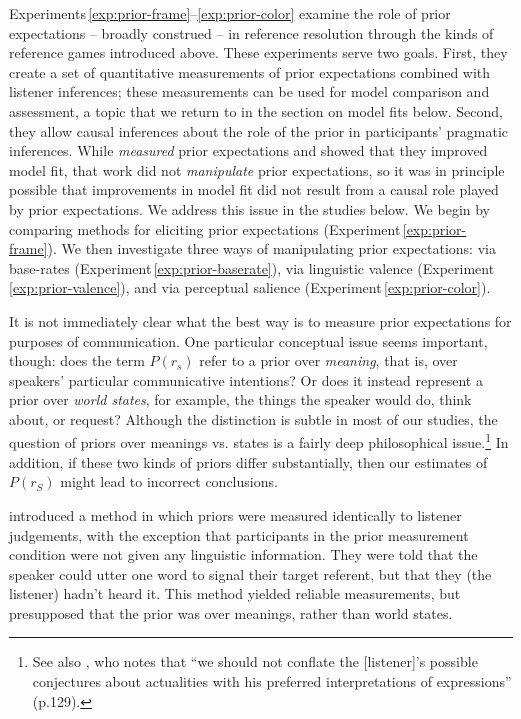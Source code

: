 \documentclass[man,noapacite]{apa2}
\newcounter{Experiment}
\newcommand{\exptref}[1]{Experiment\,\ref{#1}}
\newcommand{\exptrefrange}[2]{Experiments\,\ref{#1}--\ref{#2}}
\begin{document}
\exptrefrange{exp:prior-frame}{exp:prior-color} examine the role of prior expectations -- broadly construed -- in reference resolution through the kinds of reference games introduced above. These experiments serve two goals. First, they create a set of quantitative measurements of prior expectations combined with listener inferences; these measurements can be used for model comparison and assessment, a topic that we return to in the section on model fits below. Second, they allow causal inferences about the role of the prior in participants' pragmatic inferences. While  \emph{measured} prior expectations and showed that they improved model fit, that work did not \emph{manipulate} prior expectations, so it was in principle possible that improvements in model fit did not result from a causal role played by prior expectations. We address this issue in the studies below. We begin by comparing methods for eliciting prior expectations (\exptref{exp:prior-frame}). We then investigate three ways of manipulating prior expectations: via base-rates (\exptref{exp:prior-baserate}), via linguistic valence (\exptref{exp:prior-valence}), and via perceptual salience (\exptref{exp:prior-color}).

It is not immediately clear what the best way is to measure prior expectations for purposes of communication. One particular conceptual issue seems important, though: does the term $P(r_s)$ refer to a prior over \emph{meaning}, that is, over speakers' particular communicative intentions? Or does it instead represent a prior over \emph{world states}, for example, the things the speaker would do, think about, or request? Although the distinction is subtle in most of our studies, the question of priors over meanings vs. states is a fairly deep philosophical issue.\footnote{See also , who notes that ``we should not conflate the [listener]’s possible conjectures about actualities with his preferred interpretations of expressions'' (p.129).}  In addition, if these two kinds of priors differ substantially, then our estimates of $P(r_S)$ might lead to incorrect conclusions.

 introduced a method in which priors were measured identically to listener judgements, with the exception that participants in the prior measurement condition were not given any linguistic information. They were told that the speaker could utter one word to signal their target referent, but that they (the listener) hadn't heard it. This method yielded reliable measurements, but presupposed that the prior was over meanings, rather than world states.
\end{document}

